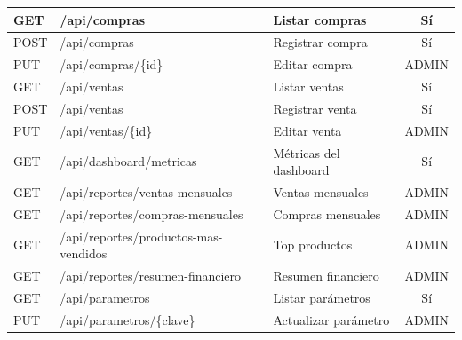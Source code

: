 \documentclass[12pt, letterpaper]{report}
\begin{document}
\begin{longtable}{|l|l|p{5cm}|c|}
GET & /api/compras & Listar compras & Sí \\ \hline
POST & /api/compras & Registrar compra & Sí \\ \hline
PUT & /api/compras/\{id\} & Editar compra & ADMIN \\ \hline
GET & /api/ventas & Listar ventas & Sí \\ \hline
POST & /api/ventas & Registrar venta & Sí \\ \hline
PUT & /api/ventas/\{id\} & Editar venta & ADMIN \\ \hline
GET & /api/dashboard/metricas & Métricas del dashboard & Sí \\ \hline
GET & /api/reportes/ventas-mensuales & Ventas mensuales & ADMIN \\ \hline
GET & /api/reportes/compras-mensuales & Compras mensuales & ADMIN \\ \hline
GET & /api/reportes/productos-mas-vendidos & Top productos & ADMIN \\ \hline
GET & /api/reportes/resumen-financiero & Resumen financiero & ADMIN \\ \hline
GET & /api/parametros & Listar parámetros & Sí \\ \hline
PUT & /api/parametros/\{clave\} & Actualizar parámetro & ADMIN \\ \hline
\end{longtable}


\end{document}
